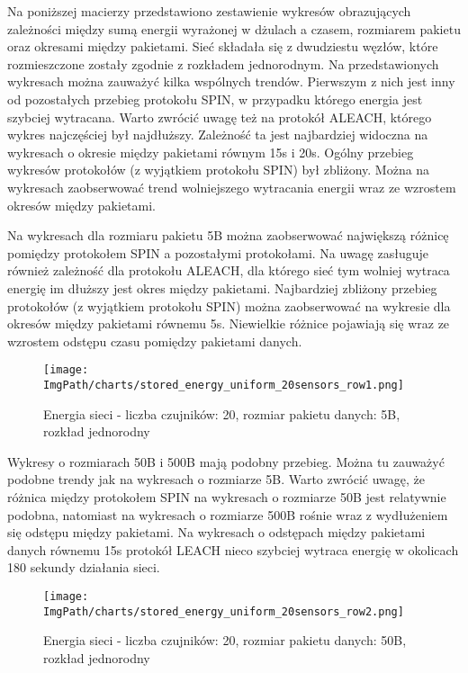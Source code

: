 Na poniższej macierzy przedstawiono zestawienie wykresów obrazujących zależności między sumą energii wyrażonej w dżulach a czasem, rozmiarem pakietu oraz okresami między pakietami. Sieć składała się z dwudziestu węzłów, które rozmieszczone zostały zgodnie z rozkładem jednorodnym.
Na przedstawionych wykresach można zauważyć kilka wspólnych trendów. Pierwszym z nich jest inny od pozostałych przebieg protokołu SPIN, w przypadku którego energia jest szybciej wytracana. Warto zwrócić uwagę też na protokół ALEACH, którego wykres najczęściej był najdłuższy. Zależność ta jest najbardziej widoczna na wykresach o okresie między pakietami równym 15s i 20s. Ogólny przebieg wykresów protokołów (z wyjątkiem protokołu SPIN) był zbliżony. Można na wykresach zaobserwować trend wolniejszego wytracania energii wraz ze wzrostem okresów między pakietami.

Na wykresach dla rozmiaru pakietu 5B można zaobserwować największą różnicę pomiędzy protokołem SPIN a pozostałymi protokołami. Na uwagę zasługuje również zależność dla protokołu ALEACH, dla którego sieć tym wolniej wytraca energię im dłuższy jest okres między pakietami. Najbardziej zbliżony przebieg protokołów (z wyjątkiem protokołu SPIN) można zaobserwować na wykresie dla okresów między pakietami równemu 5s. Niewielkie różnice pojawiają się wraz ze wzrostem odstępu czasu pomiędzy pakietami danych.

\begin{figure}[H]
	\begin{center}
		\texttt{[image: \\ImgPath/charts/stored\_energy\_uniform\_20sensors\_row1.png]}
	\end{center}
	\caption{Energia sieci - liczba czujników: 20, rozmiar pakietu danych: 5B, rozkład jednorodny}
\end{figure}
 
Wykresy o rozmiarach 50B i 500B mają podobny przebieg. Można tu zauważyć podobne trendy jak na wykresach o rozmiarze 5B. Warto zwrócić uwagę, że różnica między protokołem SPIN na wykresach o rozmiarze 50B jest relatywnie podobna, natomiast na wykresach o rozmiarze 500B rośnie wraz z wydłużeniem się odstępu między pakietami. Na wykresach o odstępach między pakietami danych równemu 15s protokół LEACH nieco szybciej wytraca energię w okolicach 180 sekundy działania sieci.

\begin{figure}[H]
	\begin{center}
		\texttt{[image: \\ImgPath/charts/stored\_energy\_uniform\_20sensors\_row2.png]}
	\end{center}
	\caption{Energia sieci - liczba czujników: 20, rozmiar pakietu danych: 50B, rozkład jednorodny}
\end{figure}

